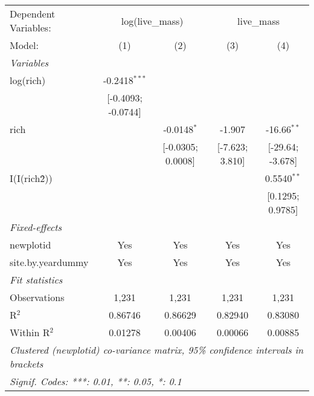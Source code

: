 \begin{tabular}{lcccc}
\tabularnewline\midrule\midrule
Dependent Variables:&\multicolumn{2}{c}{log(live\_mass)}&\multicolumn{2}{c}{live\_mass}\\
Model:&(1) & (2) & (3) & (4)\\
\midrule \emph{Variables}&   &   &   &  \\
log(rich) & -0.2418$^{***}$ &    &    &   \\
  &[-0.4093; -0.0744] &    &    &   \\
rich &    & -0.0148$^{*}$ & -1.907 & -16.66$^{**}$\\
  &   & [-0.0305; 0.0008] & [-7.623; 3.810] & [-29.64; -3.678]\\
I(I(rich\^2)) &    &    &    & 0.5540$^{**}$\\
  &   &    &    & [0.1295; 0.9785]\\
\midrule \emph{Fixed-effects}&   &   &   &  \\
newplotid & Yes & Yes & Yes & Yes\\
site.by.yeardummy & Yes & Yes & Yes & Yes\\
\midrule \emph{Fit statistics}&  & & & \\
Observations & 1,231&1,231&1,231&1,231\\
R$^2$ & 0.86746&0.86629&0.82940&0.83080\\
Within R$^2$ & 0.01278&0.00406&0.00066&0.00885\\
\midrule\midrule\multicolumn{5}{l}{\emph{Clustered (newplotid) co-variance matrix, 95\% confidence intervals in brackets}}\\
\multicolumn{5}{l}{\emph{Signif. Codes: ***: 0.01, **: 0.05, *: 0.1}}\\
\end{tabular}



